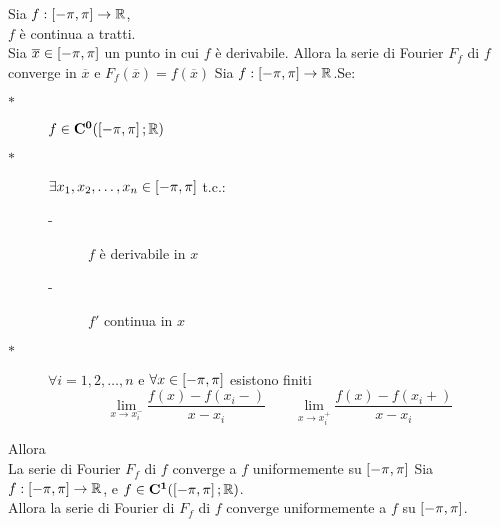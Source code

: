 \corollary
Sia $f:\left[-\pi,\pi\right]\to \mathbb{R}$,\\
$f$ è continua a tratti.\\
Sia $\overline{x}\in\left[-\pi,\pi\right]$ un punto in cui $f$ è derivabile. Allora la serie di Fourier $F_f$ di $f$ converge in $\overline{x}$ e $F_f(\overline{x})=f(\overline{x})$
\proposition
Sia $f:\left[-\pi,\pi\right]\to \mathbb{R}$.Se:\\
\begin{description}
	\item[$\ast$] $f\in \mathbf{C^{0}}(\left[-\pi,\pi\right]; \mathbb{R})$
	\item[$\ast$] $\exists x_1,x_2,\ldots,x_n\in\left[-\pi,\pi\right]$ t.c.:
	\begin{description}
		\item[-] $f$ è derivabile in $x$
		\item[-] $f'$ continua in $x$
	\end{description}
	\item[$\ast$] $\forall i=1,2,\ldots,n$ e $\forall x\in\left[-\pi,\pi\right]$ esistono finiti
	$$\lim\limits_{x\to x_i^{-}}\frac{f(x)-f(x_i-)}{x-x_i}\qquad \lim\limits_{x\to x_i^{+}}\frac{f(x)-f(x_i+)}{x-x_i}$$
	
\end{description}
Allora\\
La serie di Fourier $F_f$ di $f$ converge a $f$ uniformemente su $\left[-\pi,\pi\right]$
\corollary
Sia $f:\left[-\pi,\pi\right]\to \mathbb{R}$, e $f\in \mathbf{C^{1}}(\left[-\pi,\pi\right]; \mathbb{R})$.\\
Allora la serie di Fourier di $F_f$ di $f$ converge uniformemente a $f$ su $\left[-\pi,\pi\right]$.








 
